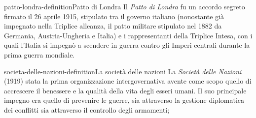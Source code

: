 \documentclass[preview]{standalone}
\begin{document}

\begin{snippetdefinition}{patto-londra-definition}{Patto di Londra}
    Il \textit{Patto di Londra} fu un accordo segreto firmato il
    26 aprile 1915, stipulato tra il governo italiano
    (nonostante già impegnato nella Triplice alleanza,
    il patto militare stipulato nel 1882 da Germania,
    Austria-Ungheria e Italia) e i rappresentanti della Triplice Intesa,
    con i quali l'Italia si impegnò a scendere in guerra contro gli Imperi centrali
    durante la prima guerra mondiale. 
\end{snippetdefinition}

\begin{snippetdefinition}{societa-delle-nazioni-definition}{La società delle nazioni}
    La \textit{Società delle Nazioni} (1919)
    stata la prima organizzazione intergovernativa
    avente come scopo quello di accrescere il benessere
    e la qualità della vita degli esseri umani.
    Il suo principale impegno
    era quello di prevenire le guerre,
    sia attraverso la gestione diplomatica dei conflitti
    sia attraverso il controllo degli armamenti; 
\end{snippetdefinition}
\end{document}
